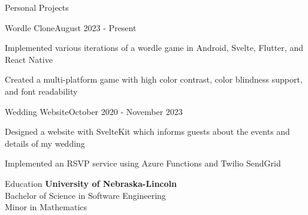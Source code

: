 \documentclass[
	11pt, %
]{article} %
\begin{document}
\begin{rSection}{Personal Projects}

	\begin{rSubsection}{Wordle Clone}{August 2023 - Present}{}{}
		\item Implemented various iterations of a wordle game in Android, Svelte, Flutter, and React Native
		\item Created a multi-platform game with high color contrast, color blindness support, and font readability
	\end{rSubsection}

	\begin{rSubsection}{Wedding Website}{October 2020 - November 2023}{}{}
		\item Designed a website with SvelteKit which informs guests about the events and details of my wedding
		\item Implemented an RSVP service using Azure Functions and Twilio SendGrid
	\end{rSubsection}

\end{rSection}

\begin{rSection}{Education}
	\textbf{University of Nebraska-Lincoln} \\
	Bachelor of Science in Software Engineering \\
	Minor in Mathematics
\end{rSection}





\end{document}
